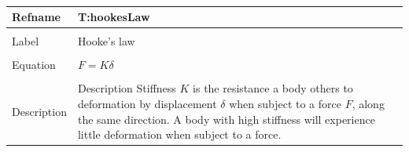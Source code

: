 \documentclass[12pt]{article}
\begin{document}
~\newline
\noindent \begin{minipage}{\textwidth}
\begin{tabular}{p{} p{}}
\toprule \textbf{Refname} & \textbf{T:hookesLaw}
\label{T:hookesLaw}
\\ \midrule \\
Label & Hooke's law
\\ \midrule \\
Equation & $F=K\delta{}$
\\ \midrule \\
Description & Description Stiffness $K$ is the resistance a body others to deformation by displacement $\delta{}$ when subject to a force $F$, along the same direction. A body with high stiffness will experience little deformation when subject to a force.
\\ \bottomrule \end{tabular}
\end{minipage}\\
\end{document}
